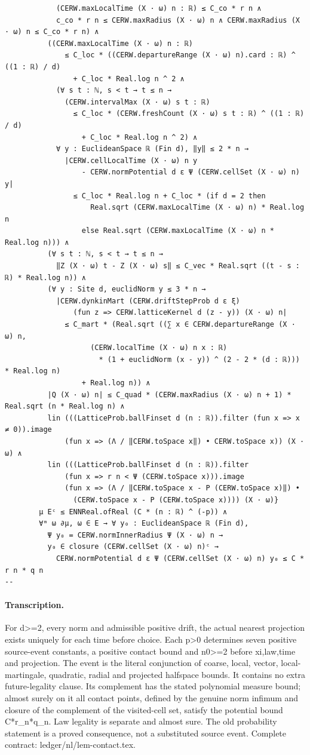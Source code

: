 \begin{verbatim}
            (CERW.maxLocalTime (X · ω) n : ℝ) ≤ C_co * r n ∧
            c_co * r n ≤ CERW.maxRadius (X · ω) n ∧ CERW.maxRadius (X · ω) n ≤ C_co * r n) ∧
          ((CERW.maxLocalTime (X · ω) n : ℝ)
              ≤ C_loc * ((CERW.departureRange (X · ω) n).card : ℝ) ^ ((1 : ℝ) / d)
                + C_loc * Real.log n ^ 2 ∧
            (∀ s t : ℕ, s < t → t ≤ n →
              (CERW.intervalMax (X · ω) s t : ℝ)
                ≤ C_loc * (CERW.freshCount (X · ω) s t : ℝ) ^ ((1 : ℝ) / d)
                  + C_loc * Real.log n ^ 2) ∧
            ∀ y : EuclideanSpace ℝ (Fin d), ‖y‖ ≤ 2 * n →
              |CERW.cellLocalTime (X · ω) n y
                  - CERW.normPotential d ε Ψ (CERW.cellSet (X · ω) n) y|
                ≤ C_loc * Real.log n + C_loc * (if d = 2 then
                    Real.sqrt (CERW.maxLocalTime (X · ω) n) * Real.log n
                  else Real.sqrt (CERW.maxLocalTime (X · ω) n * Real.log n))) ∧
          (∀ s t : ℕ, s < t → t ≤ n →
            ‖Z (X · ω) t - Z (X · ω) s‖ ≤ C_vec * Real.sqrt ((t - s : ℝ) * Real.log n)) ∧
          (∀ y : Site d, euclidNorm y ≤ 3 * n →
            |CERW.dynkinMart (CERW.driftStepProb d ε ξ)
                (fun z => CERW.latticeKernel d (z - y)) (X · ω) n|
              ≤ C_mart * (Real.sqrt ((∑ x ∈ CERW.departureRange (X · ω) n,
                    (CERW.localTime (X · ω) n x : ℝ)
                      * (1 + euclidNorm (x - y)) ^ (2 - 2 * (d : ℝ))) * Real.log n)
                  + Real.log n)) ∧
          |Q (X · ω) n| ≤ C_quad * (CERW.maxRadius (X · ω) n + 1) * Real.sqrt (n * Real.log n) ∧
          lin (((LatticeProb.ballFinset d (n : ℝ)).filter (fun x => x ≠ 0)).image
              (fun x => (Λ / ‖CERW.toSpace x‖) • CERW.toSpace x)) (X · ω) ∧
          lin (((LatticeProb.ballFinset d (n : ℝ)).filter
              (fun x => r n < Ψ (CERW.toSpace x))).image
              (fun x => (Λ / ‖CERW.toSpace x - P (CERW.toSpace x)‖) •
                (CERW.toSpace x - P (CERW.toSpace x)))) (X · ω)}
        μ Eᶜ ≤ ENNReal.ofReal (C * (n : ℝ) ^ (-p)) ∧
        ∀ᵐ ω ∂μ, ω ∈ E → ∀ y₀ : EuclideanSpace ℝ (Fin d),
          Ψ y₀ = CERW.normInnerRadius Ψ (X · ω) n →
          y₀ ∈ closure (CERW.cellSet (X · ω) n)ᶜ →
            CERW.normPotential d ε Ψ (CERW.cellSet (X · ω) n) y₀ ≤ C * r n * q n
--
\end{verbatim}
\paragraph{Transcription.}
For d>=2, every norm and admissible positive drift, the actual nearest projection exists uniquely for each time before choice. Each p>0 determines seven positive source-event constants, a positive contact bound and n0>=2 before xi,law,time and projection. The event is the literal conjunction of coarse, local, vector, local-martingale, quadratic, radial and projected halfspace bounds. It contains no extra future-legality clause. Its complement has the stated polynomial measure bound; almost surely on it all contact points, defined by the genuine norm infimum and closure of the complement of the visited-cell set, satisfy the potential bound C*r_n*q_n. Law legality is separate and almost sure. The old probability statement is a proved consequence, not a substituted source event. Complete contract: ledger/nl/lem-contact.tex.
